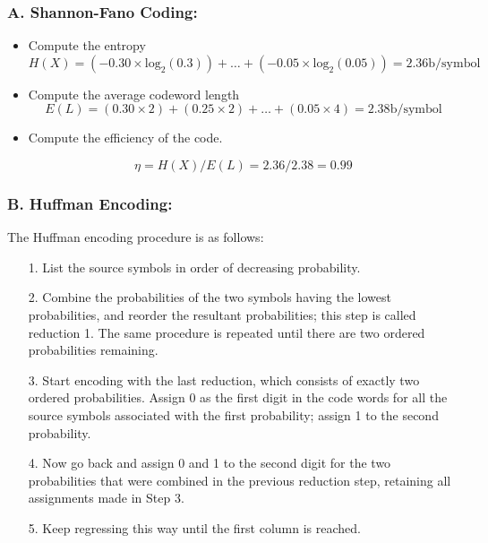 ﻿\documentclass[a4]{beamer}
\begin{document}
\begin{frame}
\frametitle{A. Shannon-Fano Coding:}
\begin{itemize}
\item Compute the entropy
\[H(X) = ( -0.30 \times \mbox{log}_2(0.3) ) +  \ldots +( -0.05 \times \mbox{log}_2(0.05)) = 2.36 \mbox{b/symbol} \]

\item Compute the average codeword length
\[E(L) = ( 0.30 \times 2 ) +( 0.25 \times 2)  + \ldots + ( 0.05 \times 4) = 2.38 \mbox{b/symbol} \]

\item Compute the efficiency of the code.

\[ \eta  = H(X) / E(L)  = 2.36 / 2.38  = 0.99 \]

\end{itemize}
\end{frame}
\begin{frame}\frametitle{B. Huffman Encoding:}
 The Huffman encoding procedure is as follows:

\begin{itemize}\item[1.] List the source symbols in order of decreasing probability.
\item[2.] Combine the probabilities of the two symbols having the lowest probabilities, and reorder
the resultant probabilities; this step is called reduction 1. The same procedure is repeated until
there are two ordered probabilities remaining.
\item[3.] Start encoding with the last reduction, which consists of exactly two ordered probabilities. Assign
0 as the first digit in the code words for all the source symbols associated with the first probability;
assign 1 to the second probability.
\item[4.] Now go back and assign 0 and 1 to the second digit for the two probabilities that were combined
in the previous reduction step, retaining all assignments made in Step 3.
\item[5.] Keep regressing this way until the first column is reached.
\end{itemize}
\end{frame}
\end{document}
